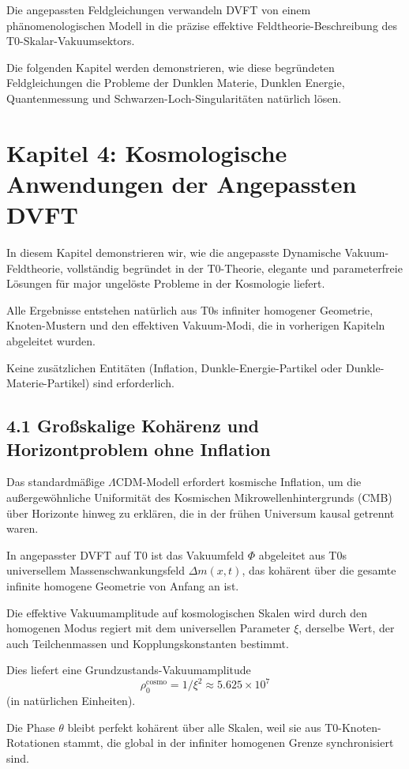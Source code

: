 	Die angepassten Feldgleichungen verwandeln DVFT von einem phänomenologischen Modell in die präzise effektive Feldtheorie-Beschreibung des T0-Skalar-Vakuumsektors.
	
	Die folgenden Kapitel werden demonstrieren, wie diese begründeten Feldgleichungen die Probleme der Dunklen Materie, Dunklen Energie, Quantenmessung und Schwarzen-Loch-Singularitäten natürlich lösen.
	
	\section{Kapitel 4: Kosmologische Anwendungen der Angepassten DVFT}
	
	In diesem Kapitel demonstrieren wir, wie die angepasste Dynamische Vakuum-Feldtheorie, vollständig begründet in der T0-Theorie, elegante und parameterfreie Lösungen für major ungelöste Probleme in der Kosmologie liefert.
	
	Alle Ergebnisse entstehen natürlich aus T0s infiniter homogener Geometrie, Knoten-Mustern und den effektiven Vakuum-Modi, die in vorherigen Kapiteln abgeleitet wurden.
	
	Keine zusätzlichen Entitäten (Inflation, Dunkle-Energie-Partikel oder Dunkle-Materie-Partikel) sind erforderlich.
	
	\subsection{4.1 Großskalige Kohärenz und Horizontproblem ohne Inflation}
	
	Das standardmäßige $\Lambda$CDM-Modell erfordert kosmische Inflation, um die außergewöhnliche Uniformität des Kosmischen Mikrowellenhintergrunds (CMB) über Horizonte hinweg zu erklären, die in der frühen Universum kausal getrennt waren.
	
	In angepasster DVFT auf T0 ist das Vakuumfeld $\Phi$ abgeleitet aus T0s universellem Massenschwankungsfeld $\Delta m(x,t)$, das kohärent über die gesamte infinite homogene Geometrie von Anfang an ist.
	
	Die effektive Vakuumamplitude auf kosmologischen Skalen wird durch den homogenen Modus regiert mit dem universellen Parameter $\xi$, derselbe Wert, der auch Teilchenmassen und Kopplungskonstanten bestimmt.
	
	Dies liefert eine Grundzustands-Vakuumamplitude
	\[
	\rho_0^{\text{cosmo}} = 1 / \xi^2 \approx 5.625 \times 10^7
	\]
	(in natürlichen Einheiten).
	
	Die Phase $\theta$ bleibt perfekt kohärent über alle Skalen, weil sie aus T0-Knoten-Rotationen stammt, die global in der infiniter homogenen Grenze synchronisiert sind.
	
